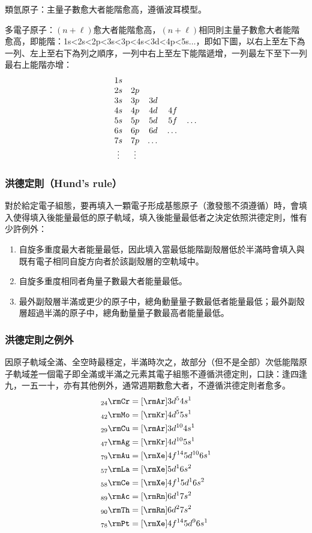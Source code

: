 \documentclass[a4paper,12pt]{report}
\begin{document}
\bit
\item 類氫原子：主量子數愈大者能階愈高，遵循波耳模型。
\item 多電子原子：$(n+\ell)$愈大者能階愈高，$(n+\ell)$相同則主量子數愈大者能階愈高，即能階：1s<2s<2p<3s<3p<4s<3d<4p<5s$\ldots$，即如下圖，以右上至左下為一列、左上至右下為列之順序，一列中右上至左下能階遞增，一列最左下至下一列最右上能階亦增：
\[\begin{array}{cccccc}
1s\\
2s & 2p \\
3s & 3p & 3d \\
4s & 4p & 4d & 4f \\
5s & 5p & 5d & 5f & $\ldots$ \\
6s & 6p & 6d & $\ldots$ \\
7s & 7p & $\ldots$ \\
$\vdots$ & $\vdots$ &
\end{array}\]
\eit
\subsubsection{洪德定則（Hund's rule）}
對於給定電子組態，要再填入一顆電子形成基態原子（激發態不須遵循）時，會填入使得填入後能量最低的原子軌域，填入後能量最低者之決定依照洪德定則，惟有少許例外：
\begin{enumerate}
\item 自旋多重度最大者能量最低，因此填入當最低能階副殼層低於半滿時會填入與既有電子相同自旋方向者於該副殼層的空軌域中。
\item 自旋多重度相同者角量子數最大者能量最低。
\item 最外副殼層半滿或更少的原子中，總角動量量子數最低者能量最低；最外副殼層超過半滿的原子中，總角動量量子數最高者能量最低。
\end{enumerate}
\subsubsection{洪德定則之例外}
因原子軌域全滿、全空時最穩定，半滿時次之，故部分（但不是全部）次低能階原子軌域差一個電子即全滿或半滿之元素其電子組態不遵循洪德定則，口訣：逢四逢九，一五一十，亦有其他例外，通常週期數愈大者，不遵循洪德定則者愈多。
\[\begin{aligned}
& _{24}\rmCr = [\rmAr] 3d^5 4s^1\\
& _{42}\rmMo = [\rmKr] 4d^5 5s^1\\
& _{29}\rmCu = [\rmAr] 3d^{10} 4s^1\\
& _{47}\rmAg = [\rmKr] 4d^{10} 5s^1\\
& _{79}\rmAu = [\rmXe] 4f^{14} 5d^{10} 6s^1\\
& _{57}\rmLa = [\rmXe] 5d^1 6s^2\\
& _{58}\rmCe = [\rmXe] 4f^1 5d^1 6s^2\\
& _{89}\rmAc = [\rmRn] 6d^1 7s^2\\
& _{90}\rmTh = [\rmRn] 6d^2 7s^2\\
& _{78}\rmPt = [\rmXe] 4f^{14} 5d^9 6s^1
\end{aligned}\]
\end{document}
